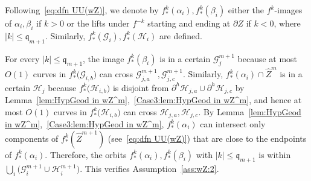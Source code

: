 \documentclass{amsart}
\newcommand{\1}{{\mathbb 1 }}
\newcommand{\FamG}{{\mathcal G}}
\newcommand{\FamH}{{\mathcal H}}
\newcommand{\wZ}{{\widehat Z}}
\newcommand{\qq}{\mathfrak{q}}
\theoremstyle{remark}
\numberwithin{equation}{section}
\theoremstyle{definition}
\begin{document}
Following~\eqref{eq:dfn UU(wZ)}, we denote by $f^k_*(\alpha_i), f^k_*(\beta_i)$ either the $f^k$-images of $\alpha_i, \beta_i$ if $k>0$ or the lifts under $f^{-k}$ starting and ending at $\partial Z$ if $k<0$, where $|k|\le \qq_{m+1}$. Similarly, $f^k_* (\FamG_{i}), f^k_* (\FamH_{i})$ are defined.

For every $|k|\le \qq_{m+1}$, the image $f^{k}_*(\beta_i)$  is in a certain $\FamG^{m+1}_j$ because at most $O(1)$ curves in $f^{k}_* \big(\FamG_{i,b}\big)$ can cross $\FamG^{m+1}_{j,a},\FamG^{m+1}_{j,c}$. Similarly, $f^{k}_*(\alpha_i)\cap \wZ^m$ is in a certain $\FamH_j$ because $f^{k}_*\big(\FamH_{i,b}\big)$ is disjoint from $\partial^h\FamH_{j,a}\cup \partial^h \FamH_{j,c} $ by Lemma~\ref{lem:HypGeod in wZ^m},~\ref{Case3:lem:HypGeod in wZ^m}, and hence at most $O(1)$ curves in $f^{k}_* \big(\FamH_{i,b}\big)$ can cross $\FamH_{j,a},\FamH_{j,c}$. By Lemma~\ref{lem:HypGeod in wZ^m},~\ref{Case3:lem:HypGeod in wZ^m}, $f^k_*(\alpha_i)$ can intersect only components of $f^k_*\left(\wZ^{m+1}\right)$ (see~\eqref{eq:dfn UU(wZ)}) that are close to the endpoints of $f^k_*(\alpha_i)$. Therefore, the orbits  $f^k_*(\alpha_i), f^k_*(\beta_i)$ with $|k|\le \qq_{m+1}$ is within $\bigcup_{i}  \big(\FamG_i^{m+1}\cup \FamH^{m+1}_i \big)$. This verifies Assumption~\ref{ass:wZ:2}.
\end{document}
